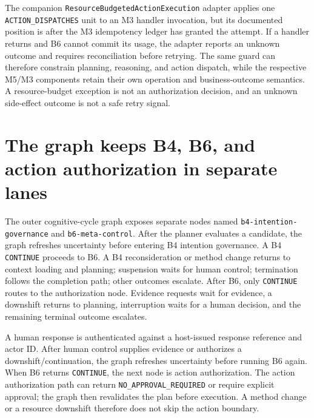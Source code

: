 The companion \texttt{ResourceBudgeted\allowbreak ActionExecution} adapter applies one \texttt{ACTION\_\allowbreak DISPATCHES} unit to an M3 handler invocation, but its documented position is after the M3 idempotency ledger has granted the attempt. If a handler returns and B6 cannot commit its usage, the adapter reports an unknown outcome and requires reconciliation before retrying. The same guard can therefore constrain planning, reasoning, and action dispatch, while the respective M5/M3 components retain their own operation and business-outcome semantics. A resource-budget exception is not an authorization decision, and an unknown side-effect outcome is not a safe retry signal.

\section{The graph keeps B4, B6, and action authorization in separate lanes}
\label{sec:ch23-separated-control-lanes}

The outer cognitive-cycle graph exposes separate nodes named \texttt{b4-intention-\allowbreak governance} and \texttt{b6-meta-\allowbreak control}. After the planner evaluates a candidate, the graph refreshes uncertainty before entering B4 intention governance. A B4 \texttt{CONTINUE} proceeds to B6. A B4 reconsideration or method change returns to context loading and planning; suspension waits for human control; termination follows the completion path; other outcomes escalate. After B6, only \texttt{CONTINUE} routes to the authorization node. Evidence requests wait for evidence, a downshift returns to planning, interruption waits for a human decision, and the remaining terminal outcome escalates.

A human response is authenticated against a host-issued response reference and actor ID. After human control supplies evidence or authorizes a downshift/continuation, the graph refreshes uncertainty before running B6 again. When B6 returns \texttt{CONTINUE}, the next node is action authorization. The action authorization path can return \texttt{NO\_APPROVAL\_REQUIRED} or require explicit approval; the graph then revalidates the plan before execution. A method change or a resource downshift therefore does not skip the action boundary.


